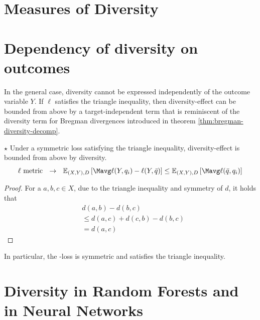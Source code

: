 \documentclass[
	twoside=false, %
]{kaobook}
\begin{document}
\section{Measures of Diversity}
\label{sec:diversity-measures}








\section{Dependency of diversity on outcomes}



In the general case, diversity cannot be expressed independently of the outcome variable $Y$. If $\ell$ satisfies the triangle inequality, then diversity-effect can be bounded from above by a target-independent term that is reminiscent of the diversity term for Bregman divergences introduced in theorem \ref{thm:bregman-diversity-decomp}.
\begin{lemma} $\star$ Under a symmetric loss satisfying the triangle inequality, diversity-effect is bounded from above by diversity. 
$$
\text{$\ell$ metric}  ~~\rightarrow~~ \mathbb{E}_{(X,Y), D}\left[ \Mavg \ell(Y, q_{i}) - \ell(Y, \bar{q}) \right] 
\leq \mathbb{E}_{(X,Y),D}\left[ \Mavg \ell(\bar{q}, q_{i}) \right] 
$$
\end{lemma}
\begin{proof}
For a $a,b,c \in X$, due to the triangle inequality and symmetry of $d$, it holds that
\begin{align*}
& d(a,b) - d(b,c)  \\
& \leq d(a,c) + d(c,b) - d(b,c) \\
&= d(a,c)
\end{align*}
\end{proof}
In particular, the \zeroone-loss is symmetric and satisfies the triangle inequality.

\section{Diversity in Random Forests and in Neural Networks}
\label{sec:diversity-rfs-nns}
\end{document}
